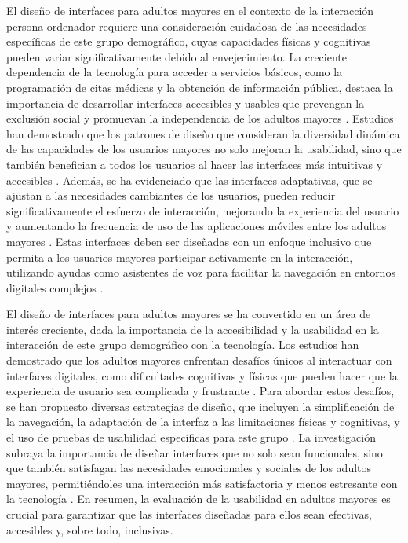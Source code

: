 El diseño de interfaces para adultos mayores en el contexto de la interacción persona-ordenador requiere una consideración cuidadosa de las necesidades específicas de este grupo demográfico, cuyas capacidades físicas y cognitivas pueden variar significativamente debido al envejecimiento. La creciente dependencia de la tecnología para acceder a servicios básicos, como la programación de citas médicas y la obtención de información pública, destaca la importancia de desarrollar interfaces accesibles y usables que prevengan la exclusión social y promuevan la independencia de los adultos mayores \cite{zajicek_successful_2004}. Estudios han demostrado que los patrones de diseño que consideran la diversidad dinámica de las capacidades de los usuarios mayores no solo mejoran la usabilidad, sino que también benefician a todos los usuarios al hacer las interfaces más intuitivas y accesibles \cite{morris_user_1994, zajicek_successful_2004}. Además, se ha evidenciado que las interfaces adaptativas, que se ajustan a las necesidades cambiantes de los usuarios, pueden reducir significativamente el esfuerzo de interacción, mejorando la experiencia del usuario y aumentando la frecuencia de uso de las aplicaciones móviles entre los adultos mayores \cite{romero_long-term_2020}. Estas interfaces deben ser diseñadas con un enfoque inclusivo que permita a los usuarios mayores participar activamente en la interacción, utilizando ayudas como asistentes de voz para facilitar la navegación en entornos digitales complejos \cite{yu_where_2023}.

El diseño de interfaces para adultos mayores se ha convertido en un área de interés creciente, dada la importancia de la accesibilidad y la usabilidad en la interacción de este grupo demográfico con la tecnología. Los estudios han demostrado que los adultos mayores enfrentan desafíos únicos al interactuar con interfaces digitales, como dificultades cognitivas y físicas que pueden hacer que la experiencia de usuario sea complicada y frustrante \cite{chiu_redesigning_2019, neves_usability_2019, abdullah_usability_2018}. Para abordar estos desafíos, se han propuesto diversas estrategias de diseño, que incluyen la simplificación de la navegación, la adaptación de la interfaz a las limitaciones físicas y cognitivas, y el uso de pruebas de usabilidad específicas para este grupo \cite{correia_design_2014, salman_design_2023}. La investigación subraya la importancia de diseñar interfaces que no solo sean funcionales, sino que también satisfagan las necesidades emocionales y sociales de los adultos mayores, permitiéndoles una interacción más satisfactoria y menos estresante con la tecnología \cite{silva_experts_2020, wang_research_2020}. En resumen, la evaluación de la usabilidad en adultos mayores es crucial para garantizar que las interfaces diseñadas para ellos sean efectivas, accesibles y, sobre todo, inclusivas.
   
